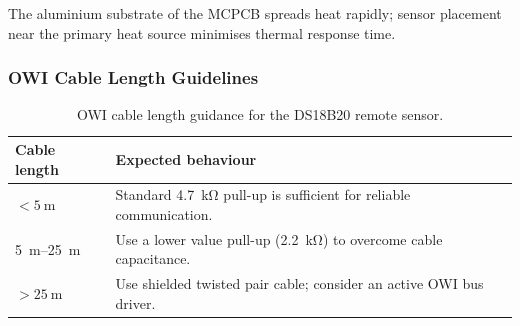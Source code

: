 The aluminium substrate of the \ac{MCPCB} spreads heat rapidly; sensor placement near the primary heat source minimises thermal response time.

\subsubsection{\ac{OWI} Cable Length Guidelines}
\label{sec:onewire_cable}

\begin{table}[H]
  \caption{\ac{OWI} cable length guidance for the DS18B20 remote sensor.}
  \label{tab:onewire_cable}
  \centering
  \begin{tabularx}{\textwidth}{|l|X|}
    \hline
    \textbf{Cable length} & \textbf{Expected behaviour} \\ \hline \hline
    $< \SI{5}{\metre}$      & Standard \SI{4.7}{\kilo\ohm} pull-up is sufficient for reliable communication. \\ \hline
    \SI{5}{\metre}--\SI{25}{\metre} & Use a lower value pull-up (\SI{2.2}{\kilo\ohm}) to overcome cable capacitance. \\ \hline
    $> \SI{25}{\metre}$     & Use shielded twisted pair cable; consider an active \ac{OWI} bus driver. \\ \hline
  \end{tabularx}
\end{table}
